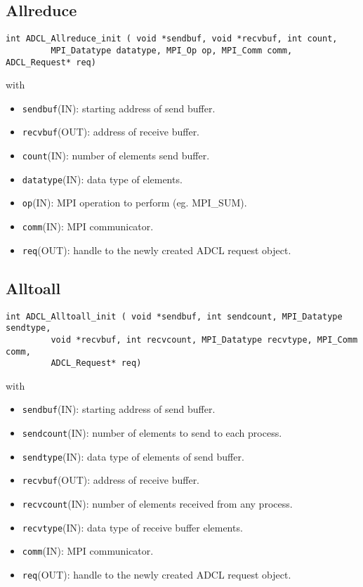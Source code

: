 \subsection{Allreduce}

\begin{verbatim}
int ADCL_Allreduce_init ( void *sendbuf, void *recvbuf, int count,
         MPI_Datatype datatype, MPI_Op op, MPI_Comm comm, ADCL_Request* req)
\end{verbatim}
with
\begin{itemize}
\item {\tt sendbuf}(IN): starting address of send buffer.
\item {\tt recvbuf}(OUT): address of receive buffer.
\item {\tt count}(IN): number of elements send buffer.
\item {\tt datatype}(IN): data type of elements.
\item {\tt op}(IN): MPI operation to perform (eg. MPI_SUM).
\item {\tt comm}(IN): MPI communicator.
\item {\tt req}(OUT): handle to the newly created ADCL request object.
\end{itemize}

\subsection{Alltoall}

\begin{verbatim}
int ADCL_Alltoall_init ( void *sendbuf, int sendcount, MPI_Datatype sendtype,
         void *recvbuf, int recvcount, MPI_Datatype recvtype, MPI_Comm comm,
         ADCL_Request* req)
\end{verbatim}
with
\begin{itemize}
\item {\tt sendbuf}(IN): starting address of send buffer.
\item {\tt sendcount}(IN): number of elements to send to each process.
\item {\tt sendtype}(IN): data type of elements of send buffer.
\item {\tt recvbuf}(OUT): address of receive buffer.
\item {\tt recvcount}(IN): number of elements received from any process.
\item {\tt recvtype}(IN): data type of receive buffer elements.
\item {\tt comm}(IN): MPI communicator.
\item {\tt req}(OUT): handle to the newly created ADCL request object.
\end{itemize}

